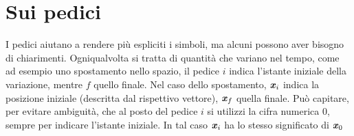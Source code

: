 \section{Sui pedici}
I pedici aiutano a rendere più espliciti i simboli, ma alcuni possono
aver bisogno di chiarimenti. Ogniqualvolta si tratta di quantità che
variano nel tempo, come ad esempio uno spostamento nello spazio, il
pedice $i$ indica l'istante iniziale della variazione, mentre $f$
quello finale. Nel caso dello spostamento, $\textbf{\textit{x}}_i$ indica la
posizione iniziale (descritta dal rispettivo vettore), $\textbf{\textit{x}}_f$
quella finale. Può capitare, per evitare ambiguità, che al posto del
pedice $i$ si utilizzi la cifra numerica 0, sempre per indicare
l'istante iniziale. In tal caso $\textbf{\textit{x}}_i$ ha lo stesso significato
di $\textbf{\textit{x}}_0$